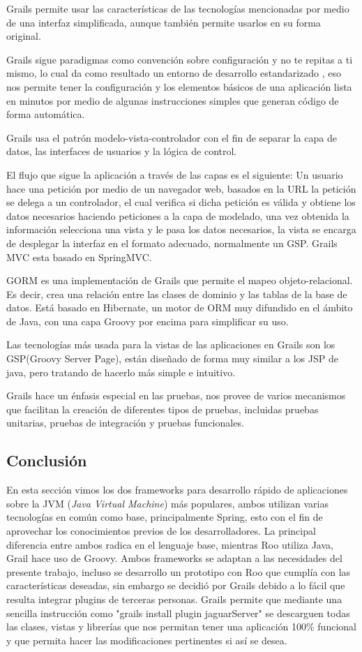 \documentclass[12pt,a4paper,spanish,openany]{book}
\begin{document}
Grails permite usar las características de las tecnologías mencionadas por medio
de una interfaz simplificada, aunque también permite usarlos en su forma
original.



Grails sigue paradigmas como convención sobre configuración y no te repitas a ti
mismo, lo cual da como resultado un entorno de desarrollo estandarizado , eso
nos permite tener la configuración y los elementos básicos de una aplicación
lista en minutos por medio de algunas instrucciones simples que generan código
de forma automática.

Grails usa el patrón modelo-vista-controlador con el fin de separar la capa de
datos, las interfaces de usuarios y la lógica de control.

El flujo que sigue la aplicación a través de las capas es el siguiente: Un
usuario hace una petición por medio de un  navegador web, basados en la URL la
petición se delega a un controlador, el cual verifica si dicha petición es
válida y obtiene los datos necesarios haciendo peticiones a la capa de modelado,
una vez obtenida la información selecciona una vista y le pasa los datos
necesarios, la vista se encarga de desplegar la interfaz en el formato adecuado,
normalmente un GSP. Grails MVC esta basado en SpringMVC.

 GORM es una implementación de Grails que permite el mapeo objeto-relacional.
 Es decir, crea una relación entre las clases de dominio y las tablas de la base
 de datos. Está basado en Hibernate, un motor de ORM muy difundido en el ámbito de Java, con una capa
 Groovy por encima para simplificar su uso.

Las tecnologías más usada para la vistas de las aplicaciones en Grails son los
GSP(Groovy Server Page), están diseñado de forma muy similar a los JSP de java,
pero tratando de hacerlo más simple e intuitivo.

Grails hace un énfasis especial en las pruebas, nos provee de varios mecanismos
que facilitan la creación de diferentes tipos de pruebas, incluidas pruebas
unitarias, pruebas de integración y pruebas funcionales.


\subsection{Conclusión}
En esta sección vimos los dos frameworks para desarrollo rápido de aplicaciones
sobre la JVM (\emph{Java Virtual Machine}) más populares, ambos utilizan varias
tecnologías en común como base, principalmente Spring, esto con el fin de aprovechar los conocimientos
previos de los desarrolladores.
La principal diferencia entre ambos radica en el lenguaje base, mientras Roo
utiliza Java, Grail hace uso de Groovy.
Ambos frameworks se adaptan a las necesidades del presente trabajo, incluso se
desarrollo un prototipo con Roo que cumplía con las características deseadas,
sin embargo se decidió por Grails debido a lo fácil que resulta integrar plugins
de terceras personas.
Grails permite que mediante una sencilla instrucción como "grails install
plugin jaguarServer" se descarguen todas las clases, vistas y librerías que nos
permitan tener una aplicación 100\% funcional y que permita hacer las
modificaciones pertinentes si así se desea.
\end{document}
